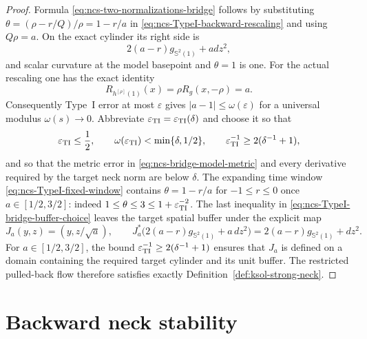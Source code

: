 \documentclass[10pt]{coll-l}
\newcommand{\Sph}{\mathbb{S}}
\theoremstyle{definition}
\theoremstyle{remark}
\numberwithin{section}{chapter}
\numberwithin{equation}{chapter}
\begin{document}
\begin{proof}
Formula
\eqref{eq:ncs-two-normalizations-bridge} follows by substituting
$\theta=(\rho-r/Q)/\rho=1-r/a$ in
\eqref{eq:ncs-TypeI-backward-rescaling} and using $Q\rho=a$.
On the exact cylinder its right side is
\begin{equation}
                  2(a-r)g_{\Sph^2(1)}+a dz^2,          \label{eq:ncs-bridge-model-metric}
\end{equation}
and scalar curvature at the model basepoint and $\theta=1$ is one.
For the actual rescaling one has the exact identity
\begin{equation}
 R_{h^{[\rho]}(1)}(x)=\rho R_g(x,-\rho)=a.            \label{eq:ncs-TypeI-rescaled-scalar-a}
\end{equation}
Consequently Type~I error at most $\varepsilon$ gives
$|a-1|\leq\omega(\varepsilon)$ for a universal modulus
$\omega(s)\to0$.  Abbreviate
$\varepsilon_{\rm TI}=\varepsilon_{\rm TI}(\delta)$ and choose it so that
\begin{equation}
 \varepsilon_{\rm TI}\leq\frac12,\qquad
 \omega(\varepsilon_{\rm TI})<\min\{\delta,1/2\},
 \qquad
 \varepsilon_{\rm TI}^{-1}\geq2(\delta^{-1}+1),       \label{eq:ncs-TypeI-bridge-buffer-choice}
\end{equation}
and so that the metric error in
\eqref{eq:ncs-bridge-model-metric} and every derivative required by the
target neck norm are below $\delta$.  The expanding
time window \eqref{eq:ncs-TypeI-fixed-window} contains
$\theta=1-r/a$ for $-1\leq r\leq0$ once
$a\in[1/2,3/2]$: indeed $1\leq\theta\leq3\leq
1+\varepsilon_{\rm TI}^{-2}$.  The last inequality in
\eqref{eq:ncs-TypeI-bridge-buffer-choice} leaves the target spatial buffer
under the explicit map
\begin{equation}
 J_a(y,z)=(y,z/\sqrt a),\qquad
 J_a^*\bigl(2(a-r)g_{\Sph^2(1)}+a\,dz^2\bigr)
        =2(a-r)g_{\Sph^2(1)}+dz^2.                  \label{eq:ncs-bridge-axial-map}
\end{equation}
For $a\in[1/2,3/2]$, the bound
$\varepsilon_{\rm TI}^{-1}\geq2(\delta^{-1}+1)$ ensures that $J_a$ is
defined on a domain containing the required target cylinder and its unit
buffer.  The restricted
pulled-back flow therefore satisfies exactly
Definition~\ref{def:ksol-strong-neck}.
\end{proof}

\section{Backward neck stability}
\label{sec:ncs-backward-stability}
\end{document}
